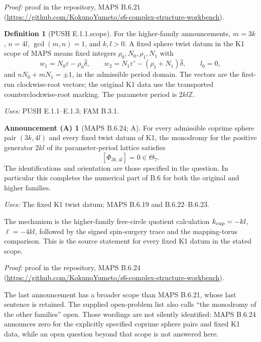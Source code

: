 \documentclass[11pt,a4paper]{article}
\theoremstyle{plain}
\theoremstyle{definition}
\newtheorem{announcement}[theorem]{Announcement (A)}
\newtheorem{definition}[theorem]{Definition}
\begin{document}
\noindent\emph{Proof:} proof in the repository, MAPS B.6.21 (\url{https://github.com/KokunoYumeto/s6-complex-structure-workbench}).

\begin{definition}[PUSH E.1.1.scope]\label{push:E.1.1.scope}
For the higher-family announcements, $m=3k$, $n=4l$,
$\gcd(m,n)=1$, and $k,l>0$. A fixed sphere twist datum in the K1 scope
of MAPS means fixed integers $\rho_0,N_0,\rho_1,N_1$ with
\[
 w_1=N_0\varepsilon-\rho_0\widehat\delta,\qquad
 w_2=N_1\varepsilon'-(\rho_1+N_1)\widehat\delta,\qquad l_0=0,
\]
and $nN_0+mN_1=\pm1$, in the admissible period domain. The vectors are
the first-run clockwise-root vectors; the original K1 data use the
transported counterclockwise-root marking. The parameter period is
$2kl\mathbb Z$.
\end{definition}
\noindent\emph{Uses:} PUSH E.1.1--E.1.3; FAM B.3.1.\par

\begin{announcement}[MAPS B.6.24; A]\label{maps:B.6.24}
For every admissible coprime sphere pair $(3k,4l)$ and every
fixed twist datum of K1, the monodromy for the positive
generator $2kl$ of its parameter-period lattice satisfies
\[
                    [\Phi_{3k,4l}]=0\in\Theta_7.
 \tag{B.6.43}
\]
The identifications and orientation are those specified in
the question.  In particular this completes the numerical
part of B.6 for both the original and higher families.
\end{announcement}
\noindent\emph{Uses:} The fixed K1 twist datum; MAPS B.6.19 and B.6.22--B.6.23.\par

The mechanism is the higher-family free-circle quotient calculation $k_{\rm cup}=-kl$, $\ell=-4kl$, followed by the signed spin-surgery trace and the mapping-torus comparison. This is the source statement for every fixed K1 datum in the stated scope.

\noindent\emph{Proof:} proof in the repository, MAPS B.6.24 (\url{https://github.com/KokunoYumeto/s6-complex-structure-workbench}).

The last announcement has a broader scope than MAPS B.6.21, whose
last sentence is retained. The supplied open-problem list also calls
``the monodromy of the other families'' open. Those wordings are not
silently identified: MAPS B.6.24 announces zero for the explicitly
specified coprime sphere pairs and fixed K1 data, while an open question
beyond that scope is not answered here.
\end{document}
